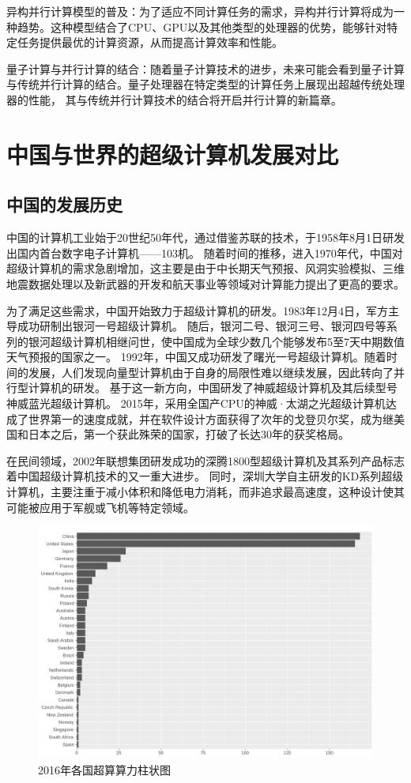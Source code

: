 \documentclass{ctexart}
\begin{document}
异构并行计算模型的普及：为了适应不同计算任务的需求，异构并行计算将成为一种趋势。这种模型结合了CPU、GPU以及其他类型的处理器的优势，能够针对特定任务提供最优的计算资源，从而提高计算效率和性能。

量子计算与并行计算的结合：随着量子计算技术的进步，未来可能会看到量子计算与传统并行计算的结合。量子处理器在特定类型的计算任务上展现出超越传统处理器的性能，
其与传统并行计算技术的结合将开启并行计算的新篇章。
\section{中国与世界的超级计算机发展对比}
\subsection{中国的发展历史}
中国的计算机工业始于20世纪50年代，通过借鉴苏联的技术，于1958年8月1日研发出国内首台数字电子计算机——103机。\cite{103Machine}
随着时间的推移，进入1970年代，中国对超级计算机的需求急剧增加，这主要是由于中长期天气预报、风洞实验模拟、三维地震数据处理以及新武器的开发和航天事业等领域对计算能力提出了更高的要求。

为了满足这些需求，中国开始致力于超级计算机的研发。1983年12月4日，军方主导成功研制出银河一号超级计算机。\cite{GalaxyToTianhe}
随后，银河二号、银河三号、银河四号等系列的银河超级计算机相继问世，使中国成为全球少数几个能够发布5至7天中期数值天气预报的国家之一。
1992年，中国又成功研发了曙光一号超级计算机。随着时间的发展，人们发现向量型计算机由于自身的局限性难以继续发展，因此转向了并行型计算机的研发。
基于这一新方向，中国研发了神威超级计算机及其后续型号神威蓝光超级计算机。\cite{ShenweiBluelight}
2015年，采用全国产CPU的神威·太湖之光超级计算机达成了世界第一的速度成就，并在软件设计方面获得了次年的戈登贝尔奖，成为继美国和日本之后，第一个获此殊荣的国家，打破了长达30年的获奖格局。\cite{SupercomputingAward}

在民间领域，2002年联想集团研发成功的深腾1800型超级计算机及其系列产品标志着中国超级计算机技术的又一重大进步。
同时，深圳大学自主研发的KD系列超级计算机，主要注重于减小体积和降低电力消耗，而非追求最高速度，这种设计使其可能被应用于军舰或飞机等特定领域。
\begin{figure}[h]
    \centering
    \includegraphics[width=\linewidth]{top500_supercomputers_by_country.png}
    \caption{2016年各国超算算力柱状图}
\end{figure}
\end{document}
